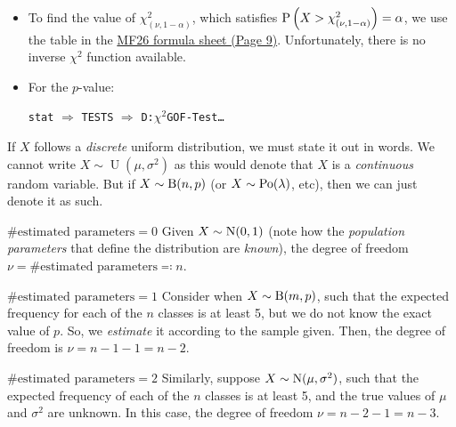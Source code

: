 \documentclass[../Notes.tex]{subfiles}
\begin{document}
\begin{GCSkills}{}
  \begin{itemize}
    \item To find the value of \(\chi^2_{(\nu,1-\alpha)}\), which satisfies \(\operatorname{P}\left(X>\chi^2_{(\nu,1-\alpha)}\right)=\alpha\), we use the table in the \href{https://www.seab.gov.sg/docs/default-source/national-examinations/syllabus/alevel/2022syllabus/List_MF26_y22_sy.pdf}{MF26 formula sheet (Page 9)}. Unfortunately, there is no inverse \(\chi^2\) function available.
    \item For the \(p\)-value:
    \begin{center}
      \texttt{stat} \(\Longrightarrow\) \texttt{TESTS} \(\Longrightarrow\) \texttt{D:\(\chi^2\)GOF-Test\dots}
    \end{center}
  \end{itemize}
\end{GCSkills}
\begin{note}
  If \(X\) follows a \emph{discrete} uniform distribution, we must state it out in words. We cannot write \(X\sim\operatorname{U}(\mu,\sigma^2)\) as this would denote that \(X\) is a \emph{continuous} random variable. But if \(X\sim\operatorname{B}(n,p)\) (or \(X\sim\operatorname{Po}(\lambda)\), etc), then we can just denote it as such. 
\end{note}
\begin{example}{\(\#\text{estimated parameters}=0\)}{}
  Given \(X\sim\operatorname{N}(0,1)\) (note how the \emph{population parameters} that define the distribution are \emph{known}), the degree of freedom \(\nu=\#\text{estimated parameters}\eqcolon n\).
\end{example}
\begin{example}{\(\#\text{estimated parameters}=1\)}{}
  Consider when \(X\sim\operatorname{B}(m,p)\), such that the expected frequency for each of the \(n\) classes is at least 5, but we do not know the exact value of \(p\). So, we \emph{estimate} it according to the sample given. Then, the degree of freedom is \(\nu=n-1-1=n-2\).
\end{example}
\begin{example}{\(\#\text{estimated parameters}=2\)}{}
  Similarly, suppose \(X\sim\operatorname{N}(\mu,\sigma^2)\), such that the expected frequency of each of the \(n\) classes is at least 5, and the true values of \(\mu\) and \(\sigma^2\) are unknown. In this case, the degree of freedom \(\nu=n-2-1=n-3\). 
\end{example}
\end{document}
